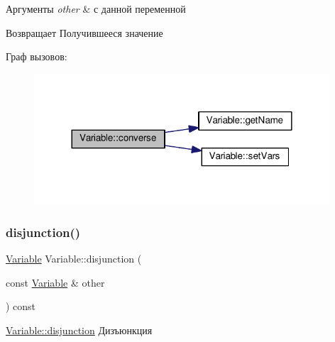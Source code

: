 \begin{DoxyParams}{Аргументы}
{\em other} & с данной переменной \\
\hline
\end{DoxyParams}
\begin{DoxyReturn}{Возвращает}
Получившееся значение 
\end{DoxyReturn}
Граф вызовов\+:\nopagebreak
\begin{figure}[H]
\begin{center}
\leavevmode
\includegraphics[width=312pt]{class_variable_adb62912a5e9433289191879e6bb7d580_cgraph}
\end{center}
\end{figure}
\mbox{\label{class_variable_a2e4849eea01ce6e2ec9ba143164e7d57}} 
\subsubsection{\texorpdfstring{disjunction()}{disjunction()}}
{\footnotesize\ttfamily \hyperlink{class_variable}{Variable} Variable\+::disjunction (\begin{DoxyParamCaption}\item[{const \hyperlink{class_variable}{Variable} \&}]{other }\end{DoxyParamCaption}) const}



\hyperlink{class_variable_a2e4849eea01ce6e2ec9ba143164e7d57}{Variable\+::disjunction} Дизъюнкция 


